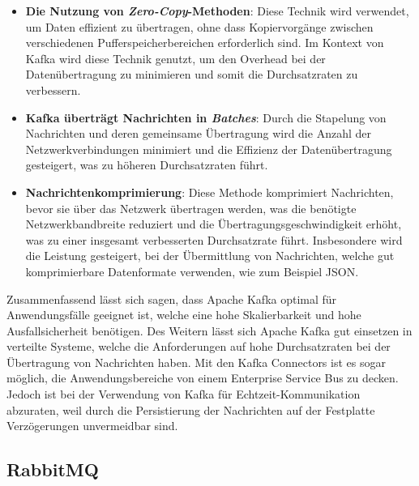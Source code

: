 \begin{itemize}
	\item \textbf{Die Nutzung von \emph{Zero-Copy}-Methoden}: Diese Technik wird verwendet, um Daten effizient zu übertragen, ohne dass Kopiervorgänge zwischen verschiedenen Pufferspeicherbereichen erforderlich sind. Im Kontext von Kafka wird diese Technik genutzt, um den Overhead bei der Datenübertragung zu minimieren und somit die Durchsatzraten zu verbessern.
	\item \textbf{Kafka überträgt Nachrichten in \emph{Batches}}: Durch die Stapelung von Nachrichten und deren gemeinsame Übertragung wird die Anzahl der Netzwerkverbindungen minimiert und die Effizienz der Datenübertragung gesteigert, was zu höheren Durchsatzraten führt.
	\item \textbf{Nachrichtenkomprimierung}: Diese Methode komprimiert Nachrichten, bevor sie über das Netzwerk übertragen werden, was die benötigte Netzwerkbandbreite reduziert und die Übertragungsgeschwindigkeit erhöht, was zu einer insgesamt verbesserten Durchsatzrate führt. Insbesondere wird die Leistung gesteigert, bei der Übermittlung von Nachrichten, welche gut komprimierbare Datenformate verwenden, wie zum Beispiel JSON.
\end{itemize}

Zusammenfassend lässt sich sagen, dass Apache Kafka optimal für Anwendungsfälle geeignet ist, welche eine hohe Skalierbarkeit und hohe Ausfallsicherheit benötigen. Des Weitern lässt sich Apache Kafka gut einsetzen in verteilte Systeme, welche die Anforderungen auf hohe Durchsatzraten bei der Übertragung von Nachrichten haben. Mit den Kafka Connectors ist es sogar möglich, die Anwendungsbereiche von einem Enterprise Service Bus zu decken. Jedoch ist bei der Verwendung von Kafka für Echtzeit-Kommunikation abzuraten, weil durch die Persistierung der Nachrichten auf der Festplatte Verzögerungen unvermeidbar sind. \cite{fuFairComparisonMessage2021}

\subsection{RabbitMQ}

